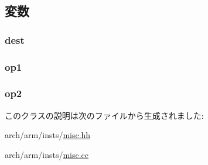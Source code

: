 \subsection{変数}
\hypertarget{classRegRegRegOp_aec72e8e45bdc87abeeeb75d2a8a9a716}{
\subsubsection[{dest}]{ {\bf dest}}}
\label{classRegRegRegOp_aec72e8e45bdc87abeeeb75d2a8a9a716}
\hypertarget{classRegRegRegOp_a4c465c43ad568f8bcf8ae71480e9cfea}{
\subsubsection[{op1}]{ {\bf op1}}}
\label{classRegRegRegOp_a4c465c43ad568f8bcf8ae71480e9cfea}
\hypertarget{classRegRegRegOp_a7799ff6cbe5a252199059eb8665820e7}{
\subsubsection[{op2}]{ {\bf op2}}}
\label{classRegRegRegOp_a7799ff6cbe5a252199059eb8665820e7}


このクラスの説明は次のファイルから生成されました:\begin{DoxyCompactItemize}
\item 
arch/arm/insts/\hyperlink{arch_2arm_2insts_2misc_8hh}{misc.hh}\item 
arch/arm/insts/\hyperlink{arch_2arm_2insts_2misc_8cc}{misc.cc}\end{DoxyCompactItemize}
